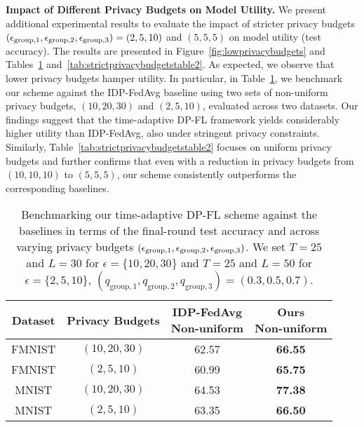 {\textbf{Impact of Different Privacy Budgets on Model Utility.} {We present additional experimental results to evaluate the impact of stricter privacy budgets $({\epsilon}_{\text{group},1}, {\epsilon}_{\text{group},2}, {\epsilon}_{\text{group},3}) = (2,5,10)$ and $(5,5,5)$ on model utility (test accuracy). The results are presented in Figure~\ref{fig:lowprivacybudgets} and Tables~\ref{tab:strictprivacybudgetstable} and~\ref{tab:strictprivacybudgetstable2}. As expected, we observe that lower privacy budgets hamper utility. In particular, in Table~\ref{tab:strictprivacybudgetstable}, we benchmark our scheme against the IDP-FedAvg baseline using two sets of non-uniform privacy budgets, $(10,20,30)$ and $(2,5,10)$, evaluated across two datasets. Our findings suggest that the time-adaptive DP-FL framework yields considerably higher utility than IDP-FedAvg, also under stringent privacy constraints. Similarly, Table~\ref{tab:strictprivacybudgetstable2} focuses on uniform privacy budgets and further confirms that even with a reduction in privacy budgets from $(10,10,10)$ to $(5,5,5)$, our scheme consistently outperforms the corresponding baselines. }


\begin{table}[h!]
\centering
\caption{
{Benchmarking our time-adaptive DP-FL scheme against the baselines in terms of the final-round test accuracy and across varying privacy budgets $({\epsilon}_{\text{group},1}, {\epsilon}_{\text{group},2}, {\epsilon}_{\text{group},3})$. We set $T=25$ and $L=30$ for $\epsilon = \{10,20,30\}$ and $T=25$ and $L=50$ for $\epsilon = \{2,5,10\}$, $(q_{\text{group},1},q_{\text{group},2},q_{\text{group},3})=(0.3,0.5,0.7)$}.}
\small
\setlength{\tabcolsep}{10pt} 
\renewcommand{\arraystretch}{1.2} 
\begin{tabular}{cccc}
\toprule
\textbf{Dataset} & \textbf{Privacy Budgets} &    \makecell[tl]{\textbf{IDP-FedAvg}\\ Non-uniform} &   \makecell[tl]{\textbf{Ours}\\ Non-uniform} \\ 
\midrule
FMNIST & $(10, 20, 30)$ & 62.57  &  \textbf{66.55} \\  
FMNIST & $(2, 5, 10)$ &  60.99  & \textbf{65.75} \\  
\hline
MNIST & $(10, 20, 30)$ & 64.53 &  \textbf{77.38} \\  
MNIST & $(2, 5, 10)$ &  63.35 &  \textbf{66.50} \\  
\bottomrule
\end{tabular}
\label{tab:strictprivacybudgetstable}
\vspace{-2ex} 
\end{table}


}
